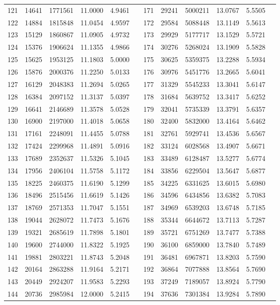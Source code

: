 \begin{longtable}{SSSSSSSSSSSS}
121&14641&1771561&11.0000&4.9461&&171&29241&5000211&13.0767&5.5505\\
122&14884&1815848&11.0454&4.9597&&172&29584&5088448&13.1149&5.5613\\
123&15129&1860867&11.0905&4.9732&&173&29929&5177717&13.1529&5.5721\\
124&15376&1906624&11.1355&4.9866&&174&30276&5268024&13.1909&5.5828\\
125&15625&1953125&11.1803&5.0000&&175&30625&5359375&13.2288&5.5934\\
126&15876&2000376&11.2250&5.0133&&176&30976&5451776&13.2665&5.6041\\
127&16129&2048383&11.2694&5.0265&&177&31329&5545233&13.3041&5.6147\\
128&16384&2097152&11.3137&5.0397&&178&31684&5639752&13.3417&5.6252\\
129&16641&2146689&11.3578&5.0528&&179&32041&5735339&13.3791&5.6357\\
130&16900&2197000&11.4018&5.0658&&180&32400&5832000&13.4164&5.6462\\
131&17161&2248091&11.4455&5.0788&&181&32761&5929741&13.4536&5.6567\\
132&17424&2299968&11.4891&5.0916&&182&33124&6028568&13.4907&5.6671\\
133&17689&2352637&11.5326&5.1045&&183&33489&6128487&13.5277&5.6774\\
134&17956&2406104&11.5758&5.1172&&184&33856&6229504&13.5647&5.6877\\
135&18225&2460375&11.6190&5.1299&&185&34225&6331625&13.6015&5.6980\\
136&18496&2515456&11.6619&5.1426&&186&34596&6434856&13.6382&5.7083\\
137&18769&2571353&11.7047&5.1551&&187&34969&6539203&13.6748&5.7185\\
138&19044&2628072&11.7473&5.1676&&188&35344&6644672&13.7113&5.7287\\
139&19321&2685619&11.7898&5.1801&&189&35721&6751269&13.7477&5.7388\\
140&19600&2744000&11.8322&5.1925&&190&36100&6859000&13.7840&5.7489\\
141&19881&2803221&11.8743&5.2048&&191&36481&6967871&13.8203&5.7590\\
142&20164&2863288&11.9164&5.2171&&192&36864&7077888&13.8564&5.7690\\
143&20449&2924207&11.9583&5.2293&&193&37249&7189057&13.8924&5.7790\\
144&20736&2985984&12.0000&5.2415&&194&37636&7301384&13.9284&5.7890\\

\end{longtable}
